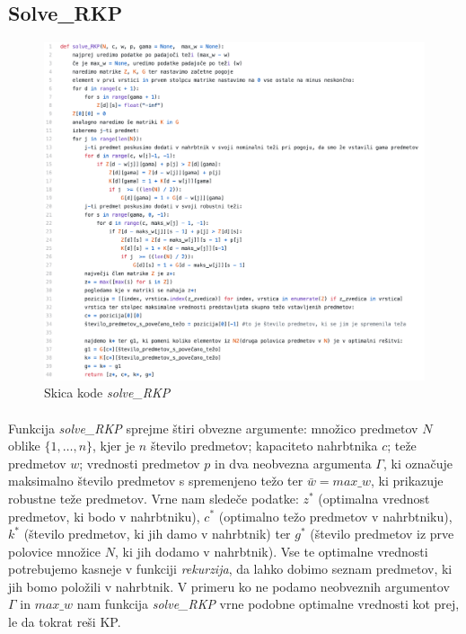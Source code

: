 \documentclass[a4paper,12pt]{article}
\theoremstyle{definition}
\begin{document}
\subsection{Solve\_RKP}
\begin{figure}[h]
    \includegraphics[width=13cm]{opis_kode.png}
    \caption{Skica kode \textit{solve\_RKP}}
    \label{fig:koda1}    
\end{figure}

\paragraph{}
\noindent Funkcija \textit{solve\_RKP} sprejme štiri obvezne argumente: množico predmetov $N$ oblike
$\{1, \dots, n\}$, kjer je $n$ število predmetov; kapaciteto nahrbtnika $c$; teže predmetov $w$; vrednosti predmetov $p$ in dva neobvezna
argumenta $\Gamma$, ki označuje maksimalno število predmetov s spremenjeno težo ter $\bar{w} = max\_w$, ki prikazuje robustne teže predmetov. 
Vrne nam sledeče podatke: $z^{*}$ (optimalna vrednost predmetov, ki bodo v nahrbtniku), $c^{*}$ (optimalno težo predmetov v nahrbtniku), $k^{*}$ (število 
predmetov, ki jih damo v nahrbtnik) ter $g^{*}$ (število predmetov iz prve polovice množice $N$, ki jih dodamo v nahrbtnik). Vse te optimalne 
vrednosti potrebujemo kasneje v funkciji \textit{rekurzija}, da lahko dobimo seznam predmetov, ki jih bomo položili v nahrbtnik. V primeru ko 
ne podamo neobveznih argumentov $\Gamma$ in $max\_w$ nam funkcija \textit{solve\_RKP} vrne podobne optimalne vrednosti kot prej, le da tokrat 
reši KP.
\par
\end{document}
